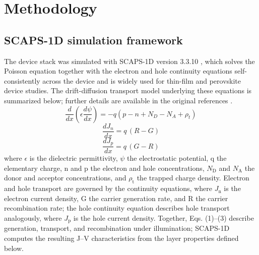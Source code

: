 \documentclass[review]{elsarticle}
\begin{document}
\section{Methodology}

\subsection{SCAPS-1D simulation framework}
The device stack was simulated with SCAPS-1D version 3.3.10 \cite{r19,r20,r21}, which solves the Poisson equation together with the electron and hole continuity equations self-consistently across the device and is widely used for thin-film and perovskite device studies. The drift-diffusion transport model underlying these equations is summarized below; further details are available in the original references \cite{r19,r20,r21}.
\begin{equation}\label{eq:poisson}
\frac{d}{dx}\left(\epsilon\frac{d\psi}{dx}\right) =
-q\left(p-n+N_{D}-N_{A}+\rho_{t}\right)
\end{equation}
\begin{equation}\label{eq:electron}
\frac{dJ_{n}}{dx} = q\,(R-G)
\end{equation}
\begin{equation}\label{eq:hole}
\frac{dJ_{p}}{dx} = q\,(G-R)
\end{equation}
where $\epsilon$ is the dielectric permittivity, $\psi$ the electrostatic potential, q the elementary charge, n and p the electron and hole concentrations, $N_{\mathrm{D}}$ and $N_{\mathrm{A}}$ the donor and acceptor concentrations, and $\rho_{\mathrm{t}}$ the trapped charge density. Electron and hole transport are governed by the continuity equations,
where $J_{\mathrm{n}}$ is the electron current density, G the carrier generation rate, and R the carrier recombination rate; the hole continuity equation describes hole transport analogously,
where $J_{\mathrm{p}}$ is the hole current density. Together, Eqs. (1)--(3) describe generation, transport, and recombination under illumination; SCAPS-1D computes the resulting J--V characteristics from the layer properties defined below.
\end{document}
